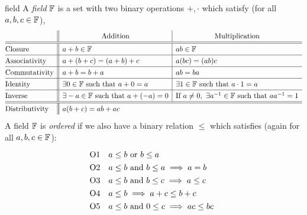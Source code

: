 \begin{axioms}{}{field}
	A \emph{field} $\mathbb{F}$ is a set with two binary operations $+,\cdot$ which satisfy (for all $a,b,c\in\mathbb{F}$),\footnotemark
	\[
		\def\arraystretch{1.3}
		\begin{array}{@{}l||l|l}
			&\multicolumn{1}{c|}{\text{Addition}}
			&
			\multicolumn{1}{c}{\text{Multiplication}}\\\hline\hline
			\text{Closure}&a+b\in\F &ab\in\F\\\hline
			\text{Associativity}&a+(b+c)=(a+b)+c &a(bc)=(ab)c\\\hline
			\text{Commutativity}&a+b=b+a &ab=ba\\\hline
			\text{Identity}&\exists 0\in\F\text{ such that }a+0=a &\exists 1\in\F \text{ such that }a\cdot 1=a\\\hline
			\text{Inverse}&\exists -a\in\F \text{ such that }a+(-a)=0 &\text{If }a\neq 0,\ \exists a^{-1}\in\F\text{ such that }aa^{-1}=1\\\hline\hline
			\text{Distributivity}&\multicolumn{2}{|l}{a(b+c)=ab+ac}%
		\end{array}
	\]
	A field $\mathbb{F}$ is \emph{ordered} if we also have a binary relation $\le$ which satisfies (again for all $a,b,c\in\mathbb{F}$):
	\[
		\def\arraystretch{1.3}
		\begin{array}{@{}ll}
			\text{O1}&a\le b\text{ or }b\le a\\
			\text{O2}&a\le b\text{ and }b\le a\implies a=b\\
			\text{O3}&a\le b\text{ and }b\le c\implies a\le c\\
			\text{O4}&a\le b\implies a+c\le b+c\\
			\text{O5}&a\le b\text{ and }0\le c\implies ac\le bc
		\end{array}
	\]
\end{axioms}


